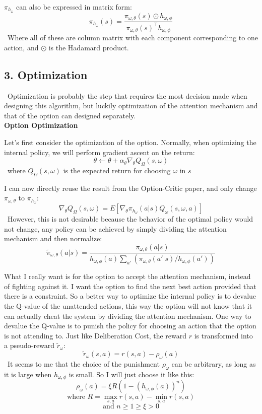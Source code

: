 \documentclass{article}
\begin{document}
	\quad $\pi_{h_\omega}$ can also be expressed in matrix form: $$\pi_{h_\omega}(s) = \frac{\pi_{\omega,\theta}(s)\odot h_{\omega, \phi}}{\pi_{\omega,\theta}(s)^\intercal h_{\omega, \phi}}$$ \qquad \ Where all of these are column matrix with each component corresponding to one action, and $\odot$ is the Hadamard product.
	\subsection*{3. Optimization}
	\qquad \ Optimization is probably the step that requires the most decision made when designing this algorithm, but luckily optimization of the attention mechanism and that of the option can designed separately.\vspace{0.2in}\\
	{\bfseries Option Optimization}\vspace{0.05in}
	
	\quad Let's first consider the optimization of the option. Normally, when optimizing the internal policy, we will perform gradient ascent on the return: $$\theta \leftarrow \theta + \alpha_\theta \nabla_\theta Q_\Omega(s,\omega)$$ \qquad \ where $Q_\Omega(s,\omega)$ is the expected return for choosing $\omega$ in $s$
	
	\quad I can now directly reuse the result from the Option-Critic paper, and only change $\pi_{\omega,\theta}$ to $\pi_{h_\omega}$: $$\nabla_\theta Q_\Omega(s,\omega) = E[\nabla_\theta \pi_{h_\omega}(a|s) Q_\omega(s,\omega,a)]$$
	\qquad \ However, this is not desirable because the behavior of the optimal policy would not change, any policy can be achieved by simply dividing the attention mechanism and then normalize: $$\widetilde{\pi}_{\omega,\theta}(a|s) = \frac{\pi_{\omega,\theta}(a|s) }{h_{\omega, \phi}(a)\sum_{a'} (\pi_{\omega,\theta}(a'|s)/h_{\omega, \phi}(a'))}$$
	
	\quad What I really want is for the option to accept the attention mechanism, instead of fighting against it. I want the option to find the next best action provided that there is a constraint. So a better way to optimize the internal policy is to devalue the Q-value of the unattended actions, this way the option will not know that it can actually cheat the system by dividing the attention mechanism. One way to devalue the Q-value is to punish the policy for choosing an action that the option is not attending to. Just like Deliberation Cost, the reward $r$ is transformed into a pseudo-reward $\widetilde{r}_\omega$: $$\widetilde{r}_\omega(s,a)=r(s,a)-\rho_\omega(a)$$ \qquad \ It seems to me that the choice of the punishment $\rho_\omega$ can be arbitrary, as long as it is large when $h_{\omega,\phi}$ is small. So I will just choose it like this:$$\rho_\omega(a)=\xi R (1-(h_{\omega,\phi}(a))^n)$$ $$\textrm{where } R=\max_{s,a}r(s,a)-\min_{s,a}r(s,a)$$ $$ \textrm{and } n\geq 1\geq\xi>0$$
	
\end{document}
